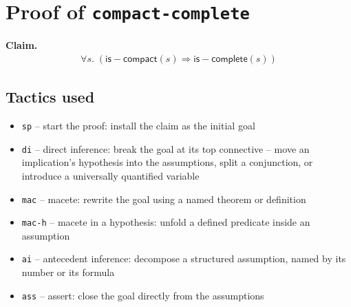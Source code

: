 \documentclass[11pt]{article}
\begin{document}
\section*{Proof of \texttt{compact-complete}}
\textbf{Claim.}
\begin{align*}
  \forall s.\; (\mathsf{is{-}compact}(s) \Rightarrow \mathsf{is{-}complete}(s))
\end{align*}
\bigskip

\subsection*{Tactics used}
\begin{itemize}
\item \texttt{sp} -- start the proof: install the claim as the initial goal
\item \texttt{di} -- direct inference: break the goal at its top connective -- move an implication's hypothesis into the assumptions, split a conjunction, or introduce a universally quantified variable
\item \texttt{mac} -- macete: rewrite the goal using a named theorem or definition
\item \texttt{mac-h} -- macete in a hypothesis: unfold a defined predicate inside an assumption
\item \texttt{ai} -- antecedent inference: decompose a structured assumption, named by its number or its formula
\item \texttt{ass} -- assert: close the goal directly from the assumptions
\end{itemize}
\end{document}
